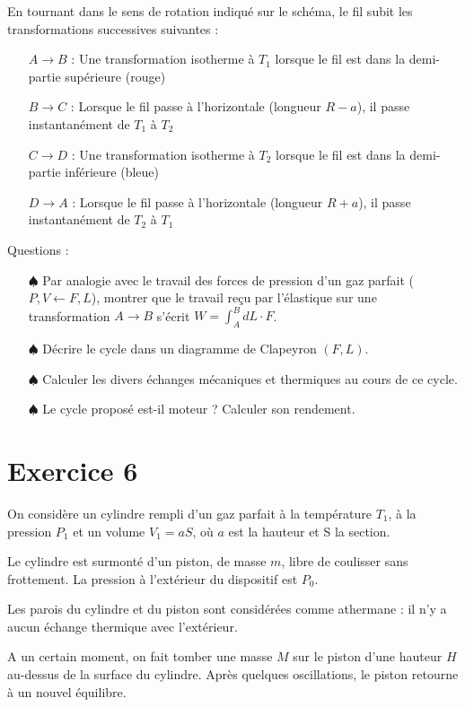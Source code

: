 \documentclass{report}
\begin{document}
En tournant dans le sens de rotation indiqué sur le schéma, le fil subit les transformations successives suivantes :
\begin{itemize}
\item[$A\rightarrow B$ :] Une transformation isotherme à $T_1$ lorsque le fil est dans la demi-partie supérieure (rouge)
\item[$B\rightarrow C$ :] Lorsque le fil passe à l'horizontale (longueur $R-a$), il passe instantanément de $T_1$ à $T_2$
\item[$C\rightarrow D$ :] Une transformation isotherme à $T_2$ lorsque le fil est dans la demi-partie inférieure (bleue)
\item[$D\rightarrow A$ :] Lorsque le fil passe à l'horizontale (longueur $R+a$), il passe instantanément de $T_2$ à $T_1$
\end{itemize}
Questions : 
\begin{itemize} 
\item[$\spadesuit$] Par analogie avec le travail des forces de pression d'un gaz parfait ($P, V\leftarrow F, L$), montrer que le travail reçu par l'élastique sur une transformation $A\rightarrow B$ s'écrit $W=\int_A^B dL\cdot F$.
\item[$\spadesuit$] Décrire le cycle dans un diagramme de Clapeyron $(F,L)$.
\item[$\spadesuit$] Calculer les divers échanges mécaniques et thermiques au cours de ce cycle.
\item[$\spadesuit$] Le cycle proposé est-il moteur ? Calculer son rendement.
\end{itemize}

\newpage

\section*{Exercice 6}

On considère un cylindre rempli d'un gaz parfait à la température $T_1$, à la pression $P_1$ et un volume $V_1=aS$, où $a$ est la hauteur et S la section.

Le cylindre est surmonté d'un piston, de masse $m$, libre de coulisser sans frottement. La pression à l'extérieur du dispositif est $P_0$.

Les parois du cylindre et du piston sont considérées comme athermane : il n'y a aucun échange thermique avec l'extérieur.

A un certain moment, on fait tomber une masse $M$ sur le piston d'une hauteur $H$ au-dessus de la surface du cylindre. Après quelques oscillations, le piston retourne à un nouvel équilibre.
\end{document}
